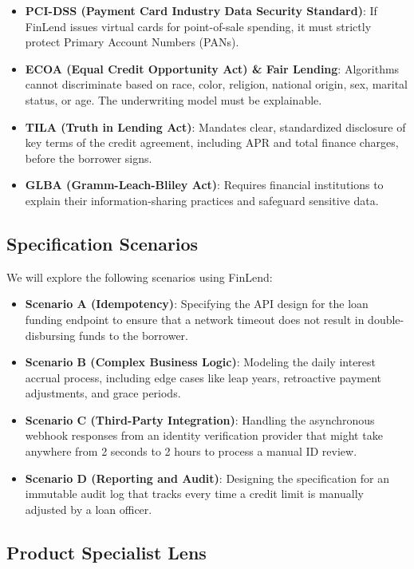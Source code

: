 \begin{itemize}
\tightlist
\item
  \textbf{PCI-DSS (Payment Card Industry Data Security Standard)}: If
  FinLend issues virtual cards for point-of-sale spending, it must
  strictly protect Primary Account Numbers (PANs).
\item
  \textbf{ECOA (Equal Credit Opportunity Act) \& Fair Lending}:
  Algorithms cannot discriminate based on race, color, religion,
  national origin, sex, marital status, or age. The underwriting model
  must be explainable.
\item
  \textbf{TILA (Truth in Lending Act)}: Mandates clear, standardized
  disclosure of key terms of the credit agreement, including APR and
  total finance charges, before the borrower signs.
\item
  \textbf{GLBA (Gramm-Leach-Bliley Act)}: Requires financial
  institutions to explain their information-sharing practices and
  safeguard sensitive data.
\end{itemize}

\subsection{Specification Scenarios}\label{specification-scenarios-1}

We will explore the following scenarios using FinLend:

\begin{itemize}
\tightlist
\item
  \textbf{Scenario A (Idempotency)}: Specifying the API design for the
  loan funding endpoint to ensure that a network timeout does not result
  in double-disbursing funds to the borrower.
\item
  \textbf{Scenario B (Complex Business Logic)}: Modeling the daily
  interest accrual process, including edge cases like leap years,
  retroactive payment adjustments, and grace periods.
\item
  \textbf{Scenario C (Third-Party Integration)}: Handling the
  asynchronous webhook responses from an identity verification provider
  that might take anywhere from 2 seconds to 2 hours to process a manual
  ID review.
\item
  \textbf{Scenario D (Reporting and Audit)}: Designing the specification
  for an immutable audit log that tracks every time a credit limit is
  manually adjusted by a loan officer.
\end{itemize}

\subsection{Product Specialist Lens}\label{product-specialist-lens-1}

